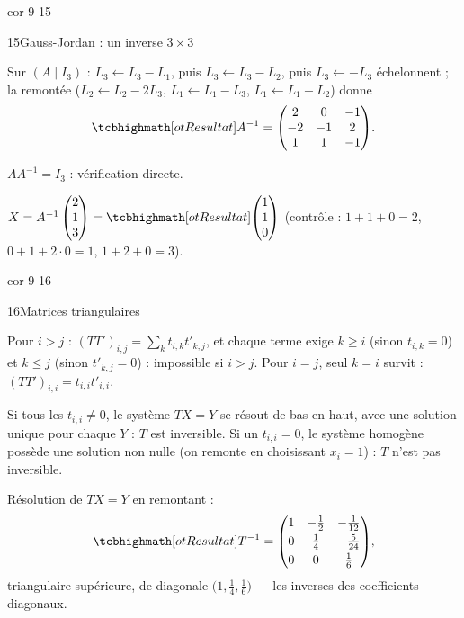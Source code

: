 \begin{blocLivre}{cor-9-15}
\begin{corrige}{15}{Gauss-Jordan : un inverse $3\times3$}
\begin{questions}
  \item Sur $(A\mid I_3)$ : $L_3\leftarrow L_3-L_1$, puis
    $L_3\leftarrow L_3-L_2$, puis $L_3\leftarrow-L_3$ échelonnent ;
    la remontée ($L_2\leftarrow L_2-2L_3$, $L_1\leftarrow L_1-L_3$,
    $L_1\leftarrow L_1-L_2$) donne
    \[
      \res{A^{-1}=\begin{pmatrix}2&0&-1\\-2&-1&2\\1&1&-1\end{pmatrix}}.
    \]
  \item $AA^{-1}=I_3$ : vérification directe.
  \item $X=A^{-1}\begin{pmatrix}2\\1\\3\end{pmatrix}
    =\res{\begin{pmatrix}1\\1\\0\end{pmatrix}}$
    (contrôle : $1+1+0=2$, $0+1+2\cdot0=1$, $1+2+0=3$).
\end{questions}
\end{corrige}
\end{blocLivre}

\begin{blocLivre}{cor-9-16}
\begin{corrige}{16}{Matrices triangulaires}
\begin{questions}
  \item Pour $i>j$ :
    $(TT')_{i,j}=\sum_{k}t_{i,k}t'_{k,j}$, et chaque terme exige $k\geq i$
    (sinon $t_{i,k}=0$) et $k\leq j$ (sinon $t'_{k,j}=0$) : impossible si
    $i>j$. Pour $i=j$, seul $k=i$ survit :
    $(TT')_{i,i}=t_{i,i}t'_{i,i}$.
  \item Si tous les $t_{i,i}\neq0$, le système $TX=Y$ se résout de bas en
    haut, avec une solution unique pour chaque $Y$ : $T$ est inversible.
    Si un $t_{i,i}=0$, le système homogène possède une solution non
    nulle (on remonte en choisissant $x_i=1$) : $T$ n'est pas inversible.
  \item Résolution de $TX=Y$ en remontant :
    \[
      \res{T^{-1}=\begin{pmatrix}1&-\tfrac12&-\tfrac{1}{12}\\[1mm]
      0&\tfrac14&-\tfrac{5}{24}\\[1mm]0&0&\tfrac16\end{pmatrix}},
    \]
    triangulaire supérieure, de diagonale $\bigl(1,\tfrac14,\tfrac16\bigr)$
    — les inverses des coefficients diagonaux.
\end{questions}
\end{corrige}
\end{blocLivre}

